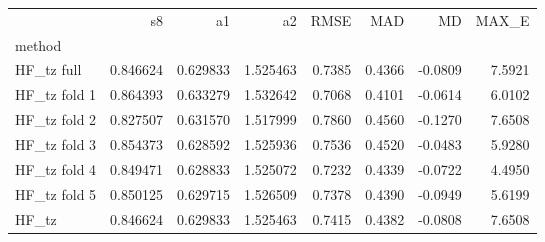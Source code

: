 \begin{tabular}{lrrrrrrr}
 & s8 & a1 & a2 & RMSE & MAD & MD & MAX_E \\
method &  &  &  &  &  &  &  \\
HF_tz full & 0.846624 & 0.629833 & 1.525463 & 0.7385 & 0.4366 & -0.0809 & 7.5921 \\
HF_tz fold 1 & 0.864393 & 0.633279 & 1.532642 & 0.7068 & 0.4101 & -0.0614 & 6.0102 \\
HF_tz fold 2 & 0.827507 & 0.631570 & 1.517999 & 0.7860 & 0.4560 & -0.1270 & 7.6508 \\
HF_tz fold 3 & 0.854373 & 0.628592 & 1.525936 & 0.7536 & 0.4520 & -0.0483 & 5.9280 \\
HF_tz fold 4 & 0.849471 & 0.628833 & 1.525072 & 0.7232 & 0.4339 & -0.0722 & 4.4950 \\
HF_tz fold 5 & 0.850125 & 0.629715 & 1.526509 & 0.7378 & 0.4390 & -0.0949 & 5.6199 \\
HF_tz & 0.846624 & 0.629833 & 1.525463 & 0.7415 & 0.4382 & -0.0808 & 7.6508 \\
\end{tabular}
